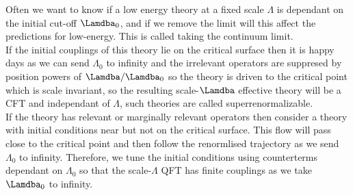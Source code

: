 \documentclass{article}
\begin{document}
Often we want to know if a low energy theory at a fixed scale $\Lambda$ is dependant on the initial cut-off $\Lamdba_0$, and if we remove the limit will this affect the predictions for low-energy. This is called taking the continuum limit. \\If the initial couplings of this theory lie on the critical surface then it is happy days as we can send $\Lambda_0$ to infinity and the irrelevant operators are suppresed by position powers of $\Lamdba/\Lamdba_0$ so the theory is driven to the critical point which is scale invariant, so the resulting scale-$\Lamdba$ effective theory will be a CFT and independant of $\Lambda$, such theories are called superrenormalizable. \\
If the theory has relevant or marginally relevant operators then consider a theory with initial conditions near but not on the critical surface. This flow will pass close to the critical point and then follow the renormlised trajectory as we send $\Lambda_0$ to infinity. Therefore, we tune the initial conditions using counterterms dependant on $\Lambda_0$ so that the scale-$\Lambda$ QFT has finite couplings as we take $\Lamdba_0$ to infinity.
\end{document}
